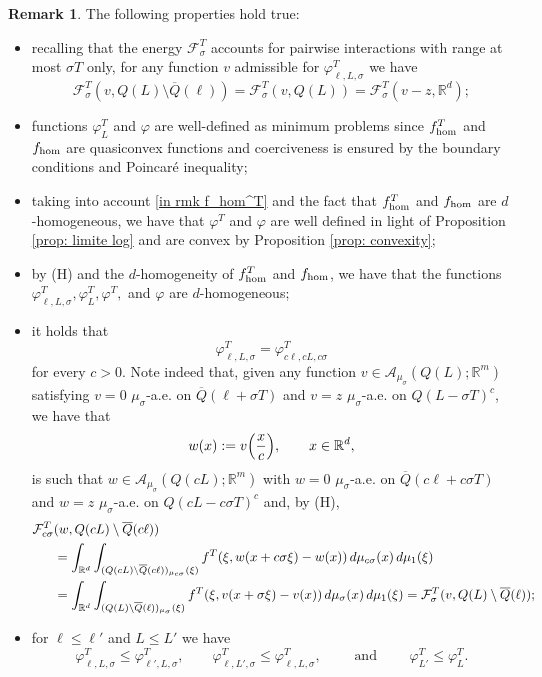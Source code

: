 \documentclass{article}
\theoremstyle{plain}
\theoremstyle{definition}
\newtheorem{remark}[theorem]{Remark}
\def\rr{{\mathbb R}}
\def\ms{\mu_\sigma}
\newcommand{\f}{\varphi}
\newcommand{\s}{\sigma}
\newcommand{\A}{\mathcal{A}}
\newcommand{\F}{\mathcal{F}}
\numberwithin{equation}{section}
\begin{document}
\begin{remark}\label{rmk: funzioni ausiliarie}
The following properties hold true:
\begin{itemize}
\item[(i)] recalling that the energy $\F^T_\s$ accounts for pairwise interactions with range at most $\s T$ only, for any function $v$ admissible for $\f^T_{\ell,L,\s}$ we have
\begin{equation*}
    \F^T_{\sigma}(v, Q(L)\setminus \overline{Q}(\ell))=\F^T_{\sigma}(v, Q(L))=\F^T_{\sigma}(v-z, \rr^d);
\end{equation*}
    \item[(ii)] functions $\f^T_L$ and $\f$ are well-defined as minimum problems since $f^T_{\rm hom}$ and $f_{\rm hom}$ are quasiconvex functions and coerciveness is ensured by the boundary conditions and Poincaré inequality; 
    \item[(iii)] taking into account \eqref{in rmk f_hom^T} and the fact that $f^T_{\rm hom}$ and $f_{\rm hom}$ are $d$-homogeneous, we have that $\f^T$ and $\f$ are well defined in light of  Proposition \ref{prop: limite log} and are convex by Proposition \ref{prop: convexity};
     \item[(iv)] by (H) and the $d$-homogeneity of $f_{\rm hom}^T$ and $f_{\rm hom}$, we have that the functions $\f_{\ell,L,\s}^T, \f^T_L, \f^T,$ and $\f$ are $d$-homogeneous;
     \item[(v)] it holds that
     \begin{equation*}
         \f^T_{\ell,L,\s}=\f^T_{c\ell,cL,c\s}
     \end{equation*}
     for every $c>0$. Note indeed that, given any function $v\in \A_{{\mu_\sigma}}(Q(L); \rr^m)$ satisfying $v=0$ $\ms$-a.e. on $\overline{Q}(\ell+\sigma T)$ and $v=z$ $\ms$-a.e. on $Q(L-\sigma T)^c$, we have that
     \begin{equation*}
         w(x):=v\Bigl(\frac{x}{c}\Bigr), \qquad x\in \rr^d,
     \end{equation*}
     is such that $w\in \A_{\ms}(Q(cL);\rr^m)$ with $w=0$ $\ms$-a.e. on $\overline{Q}(c\ell+c\sigma T)$ and $w=z$ $\ms$-a.e. on $Q(cL-c\sigma T)^c$ and, by (H),
     \begin{align*} \notag
        \F^T_{c\s}&(w, Q(cL)\setminus \overline{Q}(c\ell)) \\ \notag
        &=\int_{\mathbb{R}^{d}}\int_{(Q(cL)\setminus \overline{Q}(c\ell))_{\mu_{c\s}}(\xi)}f^T(\xi, w(x+c\s\xi)-w(x))\, d\mu_{c\s}(x)\, d\mu_1(\xi)\\ \notag
        &=\int_{\mathbb{R}^{d}}\int_{(Q(L)\setminus \overline{Q}(\ell))_{\mu_{\s}}(\xi)}f^T(\xi, v(x+\s\xi)-v(x))\, d\mu_{\s}(x)\, d\mu_1(\xi)=\F^T_{\s}(v, Q(L)\setminus \overline{Q}(\ell)) ;
\end{align*}
      \item[(vi)] for $\ell\leq\ell'$ and $L\leq L'$ we have
    \begin{equation*}
        \f^T_{\ell,L,\s}\leq\f^T_{\ell',L,\s}, \qquad \f^T_{\ell,L',\s}\leq\f^T_{\ell,L,\s}, \qquad \text{ and } \qquad \f^T_{L'}\leq\f^T_{L}.
    \end{equation*}
\end{itemize}
\end{remark}
\end{document}
